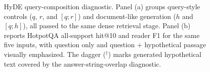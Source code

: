 \begin{figure}[t]
{%
}
\fi
\caption{HyDE query-composition diagnostic. Panel (a) groups query-style controls ($q$, $r$, and $[q;r]$) and document-like generation ($h$ and $[q;h]$), all passed to the same dense retrieval stage. Panel (b) reports HotpotQA all-support hit@10 and reader F1 for the same five inputs, with question only and question + hypothetical passage visually emphasized. The dagger ($^\dagger$) marks generated hypothetical text covered by the answer-string-overlap diagnostic.}
\label{fig:hyde_mechanism_overlap}
\end{figure}
